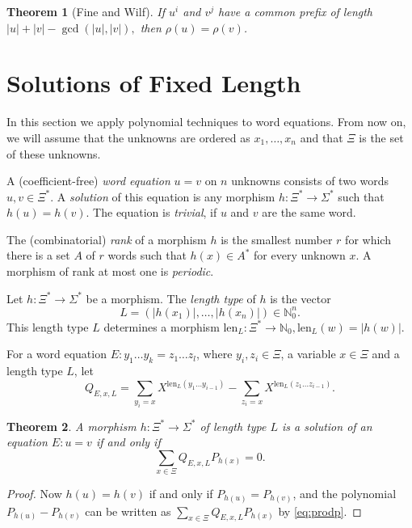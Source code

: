 \documentclass[submission]{eptcs}
\newtheorem{theorem}{Theorem}[section]
\theoremstyle{definition}
\newcommand{\No}{\mathbb N_0}
\newcommand{\px}[1]{ P_{#1} }
\newcommand{\qx}[3]{ Q_{#1,#2,#3} }
\newcommand{\len}[1]{\mathrm{len}_{#1}}
\begin{document}
\begin{theorem}[Fine and Wilf] \label{thm:finewilf}
If $u^i$ and $v^j$ have a common prefix of length
\begin{math}
    |u| + |v| - \gcd(|u|, |v|),
\end{math}
then $\rho(u) = \rho(v)$.
\end{theorem}

\section{Solutions of Fixed Length} \label{sect:fixedlength}

In this section we apply polynomial techniques to word equations.
From now on, we will assume that the unknowns are ordered as $x_1,
\dots, x_n$ and that $\Xi$ is the set of these unknowns.

A (coefficient-free) \emph{word equation} $u = v$ on $n$ unknowns
consists of two words $u, v \in \Xi^*$. A \emph{solution} of this
equation is any morphism $h: \Xi^* \to \Sigma^*$ such that $h(u) =
h(v)$. The equation is \emph{trivial}, if $u$ and $v$ are the same
word.

The (combinatorial) \emph{rank} of a morphism $h$ is the smallest
number $r$ for which there is a set $A$ of $r$ words such that $h(x)
\in A^*$ for every unknown $x$. A morphism of rank at most one is
\emph{periodic}.

Let $h: \Xi^* \to \Sigma^*$ be a morphism. The \emph{length type} of
$h$ is the vector
\begin{equation*}
    L = (|h(x_1)|, \dots, |h(x_n)|) \in \No^n.
\end{equation*}
This length type $L$ determines a morphism $\len{L}: \Xi^* \to \No,
\len{L}(w) = |h(w)|$.

For a word equation $E: y_1 \dots y_k = z_1 \dots z_l$, where $y_i,
z_i \in \Xi$, a variable $x \in \Xi$ and a length type $L$, let
\begin{equation*}
    \qx{E}{x}{L} = \sum_{y_i = x} X^{\len{L}(y_1 \dots y_{i-1})}
        - \sum_{z_i = x} X^{\len{L}(z_1 \dots z_{i-1})} .
\end{equation*}

\begin{theorem} \label{thm:weqpeq}
A morphism $h: \Xi^* \to \Sigma^*$ of length type $L$ is a solution
of an equation $E: u = v$ if and only if
\begin{equation*}
    \sum_{x \in \Xi} \qx{E}{x}{L} \px{h(x)} = 0.
\end{equation*}
\end{theorem}
\begin{proof}
Now $h(u) = h(v)$ if and only if $\px{h(u)} = \px{h(v)}$, and the
polynomial $\px{h(u)} - \px{h(v)}$ can be written as $\sum_{x \in
\Xi} \qx{E}{x}{L} \px{h(x)}$ by \eqref{eq:prodp}.
\end{proof}
\end{document}
